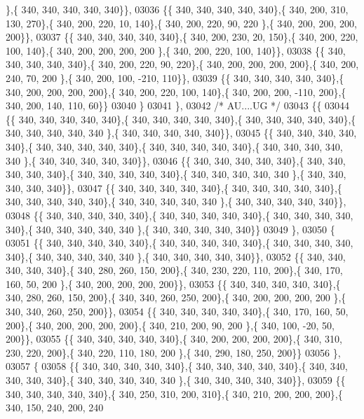 \begin{DoxyCode}
      \},\{ 340, 340, 340, 340, 340\}\},
03036 \{\{ 340, 340, 340, 340, 340\},\{ 340, 200, 310, 130, 270\},\{ 340, 200, 220,  10, 140\},\{ 340, 200, 220,  90, 220
      \},\{ 340, 200, 200, 200, 200\}\},
03037 \{\{ 340, 340, 340, 340, 340\},\{ 340, 200, 230,  20, 150\},\{ 340, 200, 220, 100, 140\},\{ 340, 200, 200, 200, 200
      \},\{ 340, 200, 220, 100, 140\}\},
03038 \{\{ 340, 340, 340, 340, 340\},\{ 340, 200, 220,  90, 220\},\{ 340, 200, 200, 200, 200\},\{ 340, 200, 240,  70, 200
      \},\{ 340, 200, 100, -210, 110\}\},
03039 \{\{ 340, 340, 340, 340, 340\},\{ 340, 200, 200, 200, 200\},\{ 340, 200, 220, 100, 140\},\{ 340, 200, 200, -110, 
      200\},\{ 340, 200, 140, 110,  60\}\}
03040 \}
03041 \},
03042 \textcolor{comment}{/* AU....UG */}
03043 \{\{
03044 \{\{ 340, 340, 340, 340, 340\},\{ 340, 340, 340, 340, 340\},\{ 340, 340, 340, 340, 340\},\{ 340, 340, 340, 340, 340
      \},\{ 340, 340, 340, 340, 340\}\},
03045 \{\{ 340, 340, 340, 340, 340\},\{ 340, 340, 340, 340, 340\},\{ 340, 340, 340, 340, 340\},\{ 340, 340, 340, 340, 340
      \},\{ 340, 340, 340, 340, 340\}\},
03046 \{\{ 340, 340, 340, 340, 340\},\{ 340, 340, 340, 340, 340\},\{ 340, 340, 340, 340, 340\},\{ 340, 340, 340, 340, 340
      \},\{ 340, 340, 340, 340, 340\}\},
03047 \{\{ 340, 340, 340, 340, 340\},\{ 340, 340, 340, 340, 340\},\{ 340, 340, 340, 340, 340\},\{ 340, 340, 340, 340, 340
      \},\{ 340, 340, 340, 340, 340\}\},
03048 \{\{ 340, 340, 340, 340, 340\},\{ 340, 340, 340, 340, 340\},\{ 340, 340, 340, 340, 340\},\{ 340, 340, 340, 340, 340
      \},\{ 340, 340, 340, 340, 340\}\}
03049 \},
03050 \{
03051 \{\{ 340, 340, 340, 340, 340\},\{ 340, 340, 340, 340, 340\},\{ 340, 340, 340, 340, 340\},\{ 340, 340, 340, 340, 340
      \},\{ 340, 340, 340, 340, 340\}\},
03052 \{\{ 340, 340, 340, 340, 340\},\{ 340, 280, 260, 150, 200\},\{ 340, 230, 220, 110, 200\},\{ 340, 170, 160,  50, 200
      \},\{ 340, 200, 200, 200, 200\}\},
03053 \{\{ 340, 340, 340, 340, 340\},\{ 340, 280, 260, 150, 200\},\{ 340, 340, 260, 250, 200\},\{ 340, 200, 200, 200, 200
      \},\{ 340, 340, 260, 250, 200\}\},
03054 \{\{ 340, 340, 340, 340, 340\},\{ 340, 170, 160,  50, 200\},\{ 340, 200, 200, 200, 200\},\{ 340, 210, 200,  90, 200
      \},\{ 340, 100, -20,  50, 200\}\},
03055 \{\{ 340, 340, 340, 340, 340\},\{ 340, 200, 200, 200, 200\},\{ 340, 310, 230, 220, 200\},\{ 340, 220, 110, 180, 200
      \},\{ 340, 290, 180, 250, 200\}\}
03056 \},
03057 \{
03058 \{\{ 340, 340, 340, 340, 340\},\{ 340, 340, 340, 340, 340\},\{ 340, 340, 340, 340, 340\},\{ 340, 340, 340, 340, 340
      \},\{ 340, 340, 340, 340, 340\}\},
03059 \{\{ 340, 340, 340, 340, 340\},\{ 340, 250, 310, 200, 310\},\{ 340, 210, 200, 200, 200\},\{ 340, 150, 240, 200, 240

\end{DoxyCode}

